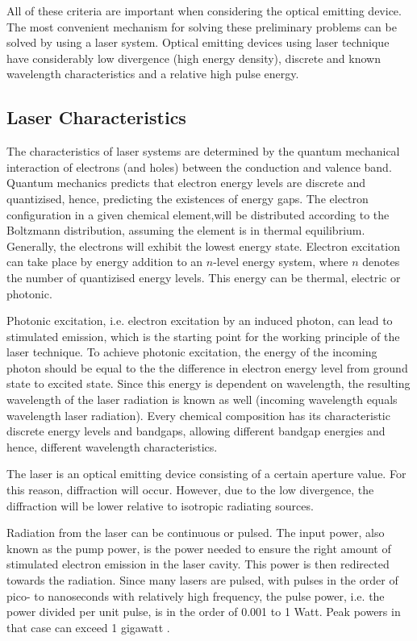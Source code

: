 All of these criteria are important when considering the optical emitting device. The most convenient mechanism for solving these preliminary problems can be solved by using a \ac{laser} system. Optical emitting devices using \acs{laser} technique have considerably low divergence (high energy density),  discrete and known wavelength characteristics and a relative high pulse energy.

\subsection{Laser Characteristics}
	\label{blDOLSRchar}
The characteristics of \acs{laser} systems are determined by the quantum mechanical interaction of electrons (and holes) between the conduction and valence band. Quantum mechanics predicts that electron energy levels are discrete and quantizised, hence, predicting the existences of energy gaps. The electron configuration in a given chemical element,will be distributed according to the Boltzmann distribution, assuming the element is in thermal equilibrium. Generally, the electrons will exhibit the lowest energy state. Electron excitation can take place by energy addition to an $n$-level energy system, where $n$ denotes the number of quantizised energy levels. This energy can be thermal, electric or photonic. 

Photonic excitation, i.e. electron excitation by an induced photon, can lead to stimulated emission, which is the starting point for the working principle of the \acs{laser} technique. To achieve photonic excitation, the energy of the incoming photon should be equal to the the difference in electron energy level from ground state to excited state. Since this energy is dependent on wavelength, the resulting wavelength of the \acs{laser} radiation is known as well (incoming wavelength equals wavelength laser radiation). Every chemical composition has its characteristic discrete energy levels and bandgaps, allowing different bandgap energies and hence, different wavelength characteristics. 

The \acs{laser} is an optical emitting device consisting of a certain aperture value. For this reason, diffraction will occur. However, due to the low divergence, the diffraction will be lower relative to isotropic radiating sources.

Radiation from the \acs{laser} can be continuous or pulsed. The input power, also known as the pump power, is the power needed to ensure the right amount of stimulated electron emission in the \acs{laser} cavity. This power is then redirected towards the radiation. Since many \acs{laser}s are pulsed, with pulses in the order of pico- to nanoseconds with relatively high frequency, the pulse power, i.e. the power divided per unit pulse, is in the order of 0.001 to 1 Watt. Peak powers in that case can exceed 1 gigawatt \cite{quantumoptics}.  

